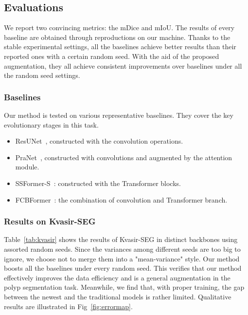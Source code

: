 \documentclass{article}
\begin{document}
\vspace{-0.3cm}


\subsection{Evaluations}

We report two convincing metrics: the mDice and mIoU. The results of every baseline are obtained through reproductions on our machine. Thanks to the stable experimental settings, all the baselines achieve better results than their reported ones with a certain random seed. With the aid of the proposed augmentation, they all achieve consistent improvements over baselines under all the random seed settings. 


\vspace{-0.3cm}
\subsubsection{Baselines}
\vspace{-0.2cm}
Our method is tested on various representative baselines. They cover the key evolutionary stages in this task. 
\begin{itemize}
    \item ResUNet~\cite{resunet}, constructed with the convolution operations.
    \item PraNet~\cite{pranet}, constructed with convolutions and augmented by the attention module.
    \item SSFormer-S~\cite{ssformer}: constructed with the Transformer blocks.
\item FCBFormer~\cite{FCBFormer}: the combination of convolution and Transformer branch.
\end{itemize}

\vspace{-0.4cm}
\subsubsection{Results on Kvasir-SEG}
Table~\ref{tab:kvasir} shows the results of Kvasir-SEG in distinct backbones using assorted random seeds. Since the variances among different seeds are too big to ignore, we choose not to merge them into a "mean-variance" style. Our method boosts all the baselines under every random seed. This verifies that our method effectively improves the data efficiency and is a general augmentation in the polyp segmentation task. Meanwhile, we find that, with proper training, the gap between the newest and the traditional models is rather limited. Qualitative results are illustrated in Fig~\ref{fig:errormap}.
\end{document}
